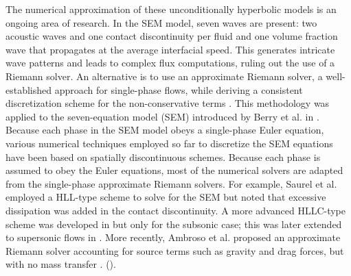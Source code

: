 \documentclass[preprint,10pt]{elsarticle}
\begin{document}
The numerical approximation of these unconditionally hyperbolic models is an ongoing area of research.
In the SEM model, seven waves are present: two acoustic waves and one contact discontinuity per fluid and one volume fraction wave that propagates 
at the average interfacial speed. This generates intricate wave patterns and leads to complex flux computations, ruling out the use of a Riemann solver. 
An alternative is to use an approximate Riemann solver, a well-established approach for single-phase flows, while deriving a consistent discretization 
scheme for the non-conservative terms \cite{Li_2004,Abgrall_2002}. 
This methodology was applied to the seven-equation model (SEM) introduced by Berry et al. in \cite{Berry_NED2010}. 
% 
Because each phase in the SEM model obeys a single-phase Euler equation, various numerical techniques employed so far to discretize the SEM equations have been 
based on spatially discontinuous schemes. Because each phase is assumed to obey the Euler equations, most of the numerical solvers are adapted from the single-phase approximate Riemann solvers. For example, Saurel et al. \cite{Saurel_2001a, Saurel_2001b} employed a HLL-type scheme to solve for the SEM but noted that excessive dissipation was added in the contact discontinuity. A more advanced HLLC-type scheme was developed in \cite{Li_2004} but only for the subsonic case; this was later extended to supersonic flows in \cite{Zein_2010}. More recently, Ambroso et al. \cite{Ambroso_2012} proposed an approximate Riemann solver accounting for source terms such as gravity and drag forces, but with no  mass transfer .  (). 
\end{document}
